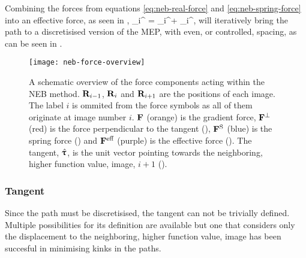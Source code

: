 Combining the forces from equations \ref{eq:neb-real-force} and \ref{eq:neb-spring-force} into an effective force, as seen in ,
\vF_i^ = \vF_i^\perp + \vF_i^,
\eeq
will iteratively bring the path to a discretisised version of the MEP, with even, or controlled, spacing, as can be seen in .

\begin{figure}[h]
\begin{center}
\texttt{[image: neb-force-overview]}
\parbox{0.85\linewidth}{\caption{A schematic overview of the force components acting within the NEB method.
${\mathrm{\mathbf{\bm{R}}}}_{i-1}$, ${\mathrm{\mathbf{\bm{R}}}}_i$ and ${\mathrm{\mathbf{\bm{R}}}}_{i+1}$ are the positions of each image.
The label $i$ is ommited from the force symbols as all of them originate at image number $i$.
${\mathrm{\mathbf{\bm{F}}}}$ (orange) is the gradient force,
${\mathrm{\mathbf{\bm{F}}}}^\perp$ (red) is the force perpendicular to the tangent (),
${\mathrm{\mathbf{\bm{F}}}}^\text{S}$ (blue) is the spring force () and
${\mathrm{\mathbf{\bm{F}}}}^\text{eff}$ (purple) is the effective force ().
The tangent, $\hat{{\mathrm{\mathbf{\bm{\uptau}}}}}$, is the unit vector pointing towards the neighboring, higher function value, image, $i+1$ ().
}
\label{fig:neb-force-overview}
}
\end{center}
\end{figure}

\subsubsection{Tangent}
Since the path must be discretisised, the tangent can not be trivially defined.
Multiple possibilities for its definition are available but one that considers only the displacement to the neighboring, higher function value, image has been succesful in minimising kinks in the paths.~\cite{neb-tangent-2000}

